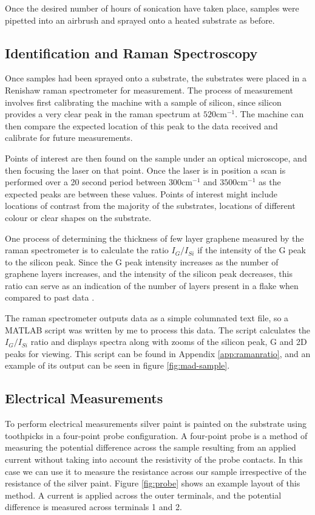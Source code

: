\documentclass[12pt,titlepage]{article}
\begin{document}
	Once the desired number of hours of sonication have taken place, samples were pipetted into an airbrush and sprayed onto a heated substrate as before.
	
	\subsection{Identification and Raman Spectroscopy}
	Once samples had been sprayed onto a substrate, the substrates were placed in a Renishaw raman spectrometer for measurement. The process of measurement involves first calibrating the machine with a sample of silicon, since silicon provides a very clear peak in the raman spectrum at $520\text{cm}^{-1}$. The machine can then compare the expected location of this peak to the data received and calibrate for future measurements.
	
	Points of interest are then found on the sample under an optical microscope, and then focusing the laser on that point. Once the laser is in position a scan is performed over a 20 second period between $300\text{cm}^{-1}$ and $3500\text{cm}^{-1}$ as the expected peaks are between these values. Points of interest might include locations of contrast from the majority of the substrates, locations of different colour or clear shapes on the substrate.
	
	One process of determining the thickness of few layer graphene measured by the raman spectrometer is to calculate the ratio $I_G/I_{Si}$ if the intensity of the G peak to the silicon peak. Since the G peak intensity increases as the number of graphene layers increases, and the intensity of the silicon peak decreases, this ratio can serve as an indication of the number of layers present in a flake when compared to past data \cite{Khrapach2012a}.
	
	The raman spectrometer outputs data as a simple columnated text file, so a MATLAB script was written by me to process this data. The script calculates the $I_G/I_{Si}$ ratio and displays spectra along with zooms of the silicon peak, G and 2D peaks for viewing. This script can be found in Appendix \ref{app:ramanratio}, and an example of its output can be seen in figure \ref{fig:mad-sample}.
	
	\subsection{Electrical Measurements}
	To perform electrical measurements silver paint is painted on the substrate using toothpicks in a four-point probe configuration. A four-point probe is a method of measuring the potential difference across the sample resulting from an applied current without taking into account the resistivity of the probe contacts. In this case we can use it to measure the resistance across our sample irrespective of the resistance of the silver paint. Figure \ref{fig:probe} shows an example layout of this method. A current is applied across the outer terminals, and the potential difference is measured across terminals 1 and 2. \cite{Smits1958}
	
\end{document}
